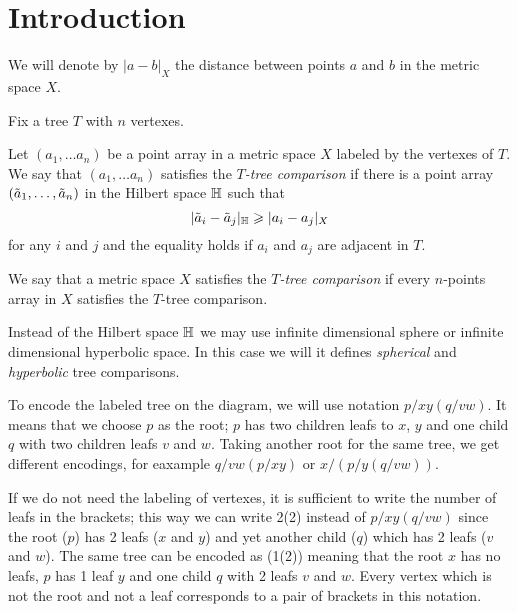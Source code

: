 \section{Introduction}\label{sec:intro}

We will denote by $|a-b|_X$ the distance between points $a$ and $b$ in the metric space $X$.

Fix a tree $T$ with $n$ vertexes.

Let $(a_1,\dots a_n)$ be a point array in a metric space $X$ labeled by the vertexes of $T$.
We say that $(a_1,\dots a_n)$  satisfies the \emph{$T$-tree comparison} if there is a point array $(\~a_1,\dots, \~a_n)$ in the Hilbert space $\HH$ such that 
\[|\~a_i-\~a_j|_\HH\ge|a_i-a_j|_X\]
for any $i$ and $j$ and the equality holds if $a_i$ and $a_j$ are adjacent in $T$.

We say that a metric space $X$ satisfies the \emph{$T$-tree comparison} if 
every $n$-points array in $X$ satisfies the $T$-tree comparison.

Instead of the Hilbert space $\HH$ we may use infinite dimensional sphere or infinite dimensional hyperbolic space.
In this case we will it defines \emph{spherical} and \emph{hyperbolic} tree comparisons.

\hide
\begin{wrapfigure}{r}{27 mm}
\vskip-4mm
\end{wrapfigure}
\unhide

To encode the labeled tree on the diagram, we will use notation $p/xy(q/vw)$.
It means that we choose $p$ as the root; 
$p$ has two children leafs to $x$, $y$ and one child $q$ with two children leafs $v$ and $w$.
Taking another root for the same tree, we get different encodings, for eaxample $q/vw(p/xy)$ or $x/(p/y(q/vw))$.

If we do not need the labeling of vertexes,
it is sufficient to write the number of leafs in the brackets;
this way we can write 2(2) instead of $p/xy(q/vw)$ since the root ($p$) has 2 leafs ($x$ and $y$) and yet another child ($q$) which has 2 leafs ($v$ and $w$).  
The same tree can be encoded as (1(2)) meaning that the root $x$ has no leafs, 
$p$ has 1 leaf $y$ and one child $q$ with 2 leafs $v$ and $w$.
Every vertex which is not the root and not a leaf corresponds to a pair of brackets in this notation.

